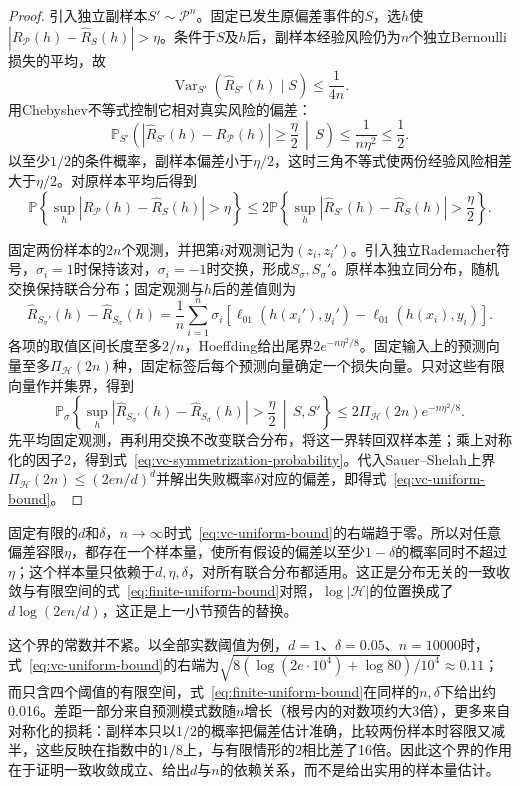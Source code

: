 \begin{proof}
引入独立副样本$S'\sim\mathcal P^n$。固定已发生原偏差事件的$S$，选$h$使$|R_{\mathcal P}(h)-\hat R_S(h)|>\eta$。条件于$S$及$h$后，副样本经验风险仍为$n$个独立Bernoulli损失的平均，故
\[
 \operatorname{Var}_{S'}\!\left(\hat R_{S'}(h)\mid S\right)
 \leq\frac{1}{4n}.
\]
用Chebyshev不等式控制它相对真实风险的偏差：
\[
 \mathbb P_{S'}\left(
   |\hat R_{S'}(h)-R_{\mathcal P}(h)|\geq\frac{\eta}{2}
   \,\middle|\,S
 \right)
 \leq\frac{1}{n\eta^2}\leq\frac12.
\]
以至少$1/2$的条件概率，副样本偏差小于$\eta/2$，这时三角不等式使两份经验风险相差大于$\eta/2$。对原样本平均后得到
\[
 \mathbb P\left\{\sup_h|R_{\mathcal P}(h)-\hat R_S(h)|>\eta\right\}
 \leq
 2\mathbb P\left\{\sup_h|\hat R_{S'}(h)-\hat R_S(h)|>\frac\eta2\right\}.
\]

固定两份样本的$2n$个观测，并把第$i$对观测记为$(z_i,z_i')$。引入独立Rademacher符号，$\sigma_i=1$时保持该对，$\sigma_i=-1$时交换，形成$S_\sigma,S_\sigma'$。原样本独立同分布，随机交换保持联合分布；固定观测与$h$后的差值则为
\[
 \hat R_{S_\sigma'}(h)-\hat R_{S_\sigma}(h)
 =\frac1n\sum_{i=1}^n\sigma_i
 \left[\ell_{01}(h(x_i'),y_i')-\ell_{01}(h(x_i),y_i)\right].
\]
各项的取值区间长度至多$2/n$，Hoeffding给出尾界$2e^{-n\eta^2/8}$。固定输入上的预测向量至多$\Pi_{\mathcal H}(2n)$种，固定标签后每个预测向量确定一个损失向量。只对这些有限向量作并集界，得到
\[
 \mathbb P_\sigma\left\{
   \sup_h|\hat R_{S_\sigma'}(h)-\hat R_{S_\sigma}(h)|>\frac\eta2
   \,\middle|\,S,S'
 \right\}
 \leq2\Pi_{\mathcal H}(2n)e^{-n\eta^2/8}.
\]
先平均固定观测，再利用交换不改变联合分布，将这一界转回双样本差；乘上对称化的因子2，得到式~\eqref{eq:vc-symmetrization-probability}。代入Sauer--Shelah上界$\Pi_{\mathcal H}(2n)\leq(2en/d)^d$并解出失败概率$\delta$对应的偏差，即得式~\eqref{eq:vc-uniform-bound}。
\end{proof}

固定有限的$d$和$\delta$，$n\to\infty$时式~\eqref{eq:vc-uniform-bound}的右端趋于零。所以对任意偏差容限$\eta$，都存在一个样本量，使所有假设的偏差以至少$1-\delta$的概率同时不超过$\eta$；这个样本量只依赖于$d,\eta,\delta$，对所有联合分布都适用。这正是分布无关的一致收敛与有限空间的式~\eqref{eq:finite-uniform-bound}对照，$\log|\mathcal H|$的位置换成了$d\log(2en/d)$，这正是上一小节预告的替换。

这个界的常数并不紧。以全部实数阈值为例，$d=1$、$\delta=0.05$、$n=10000$时，式~\eqref{eq:vc-uniform-bound}的右端为$\sqrt{8(\log(2e\cdot10^4)+\log80)/10^4}\approx0.11$；而只含四个阈值的有限空间，式~\eqref{eq:finite-uniform-bound}在同样的$n,\delta$下给出约0.016。差距一部分来自预测模式数随$n$增长（根号内的对数项约大3倍），更多来自对称化的损耗：副样本只以$1/2$的概率把偏差估计准确，比较两份样本时容限又减半，这些反映在指数中的$1/8$上，与有限情形的$2$相比差了16倍。因此这个界的作用在于证明一致收敛成立、给出$d$与$n$的依赖关系，而不是给出实用的样本量估计。

